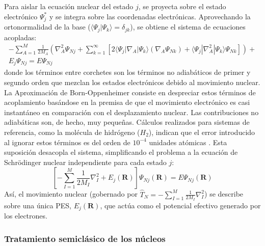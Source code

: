 Para aislar la ecuación nuclear del estado $j$, se proyecta sobre el estado electrónico $\Psi_j^*$ y se integra sobre las coordenadas electrónicas. Aprovechando la ortonormalidad de la base ($\langle \Psi_j | \Psi_k \rangle = \delta_{jk}$), se obtiene el sistema de ecuaciones acopladas:
\begin{equation}
    \begin{split}
        -\sum_{A=1}^{M} \frac{1}{2M_A} \left( \nabla^2_A \Psi_{Nj} + \sum_{k=1}^{\infty} \left[ 2 \langle \Psi_j | \nabla_A |\Psi_k \rangle \left( \nabla_A \Psi_{Nk} \right) +  \langle \Psi_j | \nabla^2_A |\Psi_k \rangle \Psi_{Nk} \right] \right) + \\ E_j \Psi_{Nj} = E \Psi_{Nj}
    \end{split}
    \label{eq:schrodinger_nuclear_acoplada_res}
\end{equation}
donde los términos entre corchetes son los términos no adiabáticos de primer y segundo orden que mezclan los estados electrónicos debido al movimiento nuclear. La Aproximación de Born-Oppenheimer consiste en despreciar estos términos de acoplamiento basándose en la premisa de que el movimiento electrónico es casi instantáneo en comparación con el desplazamiento nuclear. Las contribuciones no adiabáticas son, de hecho, muy pequeñas. Cálculos realizados para sistemas de referencia, como la molécula de hidrógeno ($H_2$), indican que el error introducido al ignorar estos términos es del orden de $10^{-4}$ unidades atómicas \cite{jensen2017introduction}. Esta suposición desacopla el sistema, simplificando el problema a la ecuación de Schrödinger nuclear independiente para cada estado $j$:
\begin{equation}
\left[ -\sum_{I=1}^{M} \frac{1}{2M_I} \nabla^2_I + E_j(\mathbf{R}) \right] \Psi_{Nj}(\mathbf{R}) = E \Psi_{Nj}(\mathbf{R})
\label{eq:schrodinger_nuclear_res}
\end{equation}
Así, el movimiento nuclear (gobernado por $\hat{T}_N = -\sum_{I=1}^M \frac{1}{2M_I} \nabla^2_I$) se describe sobre una única PES, $E_j(\mathbf{R})$, que actúa como el potencial efectivo generado por los electrones.

\subsubsection{Tratamiento semiclásico de los núcleos}

